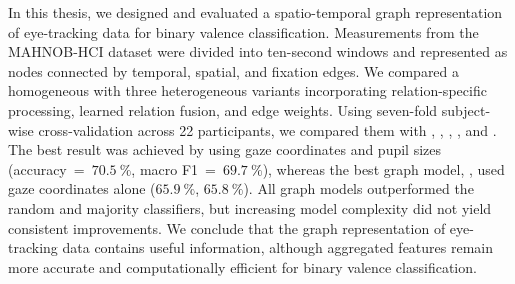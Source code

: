 In this thesis, we designed and evaluated a spatio-temporal graph representation of eye-tracking data for binary valence classification.
Measurements from the MAHNOB-HCI dataset were divided into ten-second windows and represented as nodes connected by temporal, spatial, and fixation edges.
We compared a homogeneous  with three heterogeneous variants incorporating relation-specific processing, learned relation fusion, and edge weights.
Using seven-fold subject-wise cross-validation across 22 participants, we compared them with , , , , and .
The best result was achieved by  using gaze coordinates and pupil sizes (accuracy~=~$70.5~\%$, macro F1~=~$69.7~\%$), whereas the best graph model, , used gaze coordinates alone ($65.9~\%$, $65.8~\%$).
All graph models outperformed the random and majority classifiers, but increasing model complexity did not yield consistent improvements.
We conclude that the graph representation of eye-tracking data contains useful information, although aggregated features remain more accurate and computationally efficient for binary valence classification.

